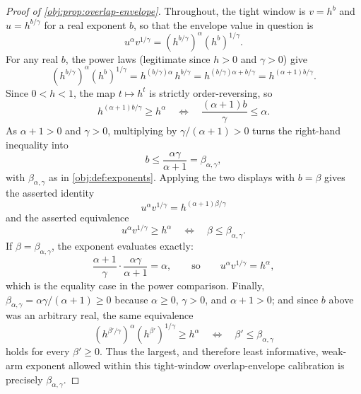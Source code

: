 \documentclass[11pt]{article}
\begin{document}
\begin{proof}[Proof of \cref{obj:prop:overlap-envelope}]
Throughout, the tight window is \(v=h^b\) and \(u=h^{b/\gamma}\) for a real exponent \(b\), so that the envelope value in question is
\[
u^\alpha v^{1/\gamma}=\left(h^{b/\gamma}\right)^\alpha\left(h^{b}\right)^{1/\gamma}.
\]
For any real \(b\), the power laws (legitimate since \(h>0\) and \(\gamma>0\)) give
\[
\left(h^{b/\gamma}\right)^\alpha\left(h^{b}\right)^{1/\gamma}
=h^{(b/\gamma)\alpha}\,h^{b/\gamma}
=h^{(b/\gamma)\alpha+b/\gamma}
=h^{(\alpha+1)b/\gamma}.
\]
Since \(0<h<1\), the map \(t\mapsto h^t\) is strictly order-reversing, so
\[
h^{(\alpha+1)b/\gamma}\ge h^\alpha
\quad\Longleftrightarrow\quad
\frac{(\alpha+1)b}{\gamma}\le \alpha .
\]
As \(\alpha+1>0\) and \(\gamma>0\), multiplying by \(\gamma/(\alpha+1)>0\) turns the right-hand inequality into
\[
b\le \frac{\alpha\gamma}{\alpha+1}=\beta_{\alpha,\gamma},
\]
with \(\beta_{\alpha,\gamma}\) as in \cref{obj:def:exponents}. %
Applying the two displays with \(b=\beta\) gives the asserted identity
\[
u^\alpha v^{1/\gamma}=h^{(\alpha+1)\beta/\gamma}
\]
and the asserted equivalence
\[
u^\alpha v^{1/\gamma}\ge h^\alpha
\quad\Longleftrightarrow\quad
\beta\le\beta_{\alpha,\gamma}.
\]
If \(\beta=\beta_{\alpha,\gamma}\), the exponent evaluates exactly:
\[
\frac{\alpha+1}{\gamma}\cdot\frac{\alpha\gamma}{\alpha+1}=\alpha,
\qquad\text{so}\qquad
u^\alpha v^{1/\gamma}=h^\alpha,
\]
which is the equality case in the power comparison. %
Finally, \(\beta_{\alpha,\gamma}=\alpha\gamma/(\alpha+1)\ge0\) because \(\alpha\ge0\), \(\gamma>0\), and \(\alpha+1>0\); and since \(b\) above was an arbitrary real, the same equivalence
\[
\left(h^{\beta'/\gamma}\right)^\alpha\left(h^{\beta'}\right)^{1/\gamma}\ge h^\alpha
\quad\Longleftrightarrow\quad
\beta'\le\beta_{\alpha,\gamma}
\]
holds for every \(\beta'\ge0\). %
Thus the largest, and therefore least informative, weak-arm exponent allowed within this tight-window overlap-envelope calibration is precisely \(\beta_{\alpha,\gamma}\). %
\end{proof}
\end{document}
